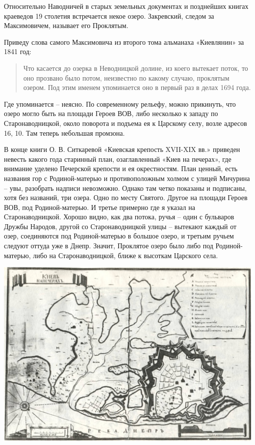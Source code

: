 Относительно Наводничей в старых земельных документах и позднейших книгах краеведов 19 столетия встречается некое озеро. Закревский, следом за Максимовичем, называет его Проклятым.

Приведу слова самого Максимовича из второго тома альманаха «Киевлянин» за 1841 год:

\begin{quotation}
Что касается до озерка в Неводницкой долине, из коего вытекает поток, то оно прозвано было потом, неизвестно по какому случаю, проклятым озером. Под этим именем упоминается оно в первый раз в делах 1694 года.
\end{quotation}

Где упоминается – неясно. По современному рельефу, можно прикинуть, что озеро могло быть на площади Героев ВОВ, либо несколько к западу по Старонаводницкой, около поворота и подъема ея к Царскому селу, возле адресов 16, 10. Там теперь небольшая промзона.

В конце книги О. В. Ситкаревой «Киевская крепость XVII-XIX вв.»\cite{sitkareva01} приведен невесть какого года старинный план, озаглавленный «Киев на печерах», где внимание уделено Печерской крепости и ея окрестностям. План ценный, есть названия гор с Родиной-матерью и противоположным холмом с улицей Мичурина – увы, разобрать надписи невозможно. Однако там четко показаны и подписаны, хотя без названий, три озера. Одно по месту Святого. Другое на площади Героев ВОВ, под Родиной-матерью. И третье примерно где я указал на Старонаводницкой. Хорошо видно, как два потока, ручья – один с бульваров Дружбы Народов, другой со Старонаводницкой улицы – вытекают каждый от озер, соединяются под Родиной-матерью в большое озеро, и третьим ручьем следуют оттуда уже в Днепр. Значит, Проклятое озеро было либо под Родиной-матерью, либо на Старонаводницкой, ближе к высоткам Царского села.
\vspace*{\fill}
\begin{center}
\includegraphics[width=\linewidth]{chast-vosp/zver/napecherah.jpg}
\end{center}
\vspace*{\fill}
\newpage

